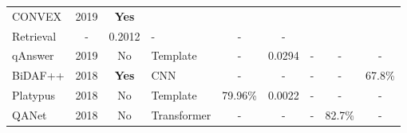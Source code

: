 \begin{landscape}
\begin{longtable}[c]{@{}lcclccccc@{}}
CONVEX                                                         & 2019                                                    & \textbf{Yes}                                                           & \begin{tabular}[c]{@{}l@{}}Information\\ Retrieval\end{tabular} & -                                                                      & 0.2012                                                                 & -                                                      & -                                                      & -                                                  \\
qAnswer                                                        & 2019                                                    & No                                                                     & Template                                                        & -                                                                      & 0.0294                                                                & -                                                      & -                                                      & -                                                  \\
BiDAF++                                                        & 2018                                                    & \textbf{Yes}                                                           & CNN                                                             & -                                                                      & -                                                                     & -                                                      & -                                                      & 67.8\%                                             \\
Platypus                                                       & 2018                                                    & No                                                                     & Template                                                        & 79.96\%                                                                & 0.0022                                                                & -                                                      & -                                                      & -                                                  \\
QANet                                                          & 2018                                                    & No                                                                     & Transformer                                                     & -                                                                      & -                                                                     & -                                                      & 82.7\%                                                 & -                                                  \\

\end{longtable}
\end{landscape}
